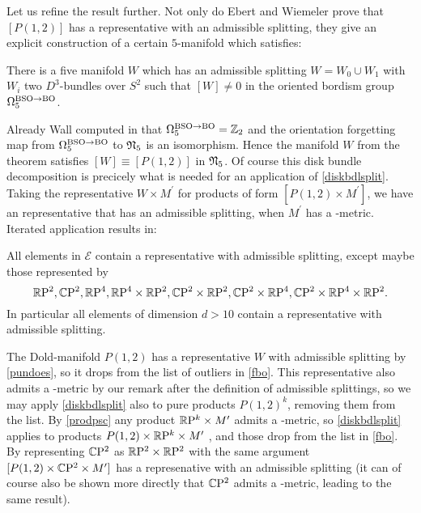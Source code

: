 Let us refine the result further.
Not only do Ebert and Wiemeler prove that $[P(1,2)]$ has a representative with an admissible splitting, they give an explicit construction of a certain $5$-manifold which satisfies:
\begin{thesislemma}\label{pundoes}
    There is a five manifold $W$ which has an admissible splitting $W=W_0 \cup W_1$ with $W_i$ two $D^3$-bundles over $S^2$ such that $[W]\neq 0$ in the oriented bordism group $\Omega_5^{\mathrm{BSO}\to\mathrm{BO}}$.
\end{thesislemma}
Already Wall computed in \cite{wall:bord} that $\Omega_5^{\mathrm{BSO}\to\mathrm{BO}}  = \mathbb{Z}_2$ and the orientation forgetting map from $\Omega_5^{\mathrm{BSO}\to\mathrm{BO}}$ to $\mathfrak{N}_5$ is an isomorphism.
Hence the manifold $W$ from the theorem satisfies $[W] \equiv [P(1,2)]$ in $\mathfrak{N}_5$.
Of course this disk bundle decomposition is precicely what is needed for an application of \ref{diskbdlsplit}.
Taking the representative $W\times M^\prime$ for products of form $[P(1,2)\times M^\prime]$, we have an representative that has an admissible splitting, when $M^\prime$ has a \psc-metric.
Iterated application results in:
\begin{thesisprop}
    All elements in $\mathcal{E}$ contain a representative with admissible splitting, except maybe those represented by 
    \begin{equation*}
        \mathbb{R}\mathrm{P}^2, \mathbb{C}\mathrm{P}^2, \mathbb{R}\mathrm{P}^4, \mathbb{R}\mathrm{P}^4\times\mathbb{R}\mathrm{P}^2, \mathbb{C}\mathrm{P}^2\times\mathbb{R}\mathrm{P}^2, \mathbb{C}\mathrm{P}^2\times\mathbb{R}\mathrm{P}^4, \mathbb{C}\mathrm{P}^2\times\mathbb{R}\mathrm{P}^4\times\mathbb{R}\mathrm{P}^2.
    \end{equation*}
    In particular all elements of dimension $d>10$ contain a representative with admissible splitting.
\end{thesisprop}
\prf
The Dold-manifold $P(1,2)$ has a representative $W$ with admissible splitting by \ref{pundoes}, so it drops from the list of outliers in \ref{fbo}.
This representative also admits a \psc-metric by our remark after the definition of admissible splittings,
so we may apply \ref{diskbdlsplit} also to pure products $P(1,2)^k$, removing them from the list.
By \ref{prodpsc} any product $\mathbb{R}\mathrm{P}^k\times M^\prime$ admits a \psc-metric, so \ref{diskbdlsplit} applies to products $P(1,2)\times\mathbb{R}\mathrm{P}^k\times M^\prime$ , and those drop from the list in \ref{fbo}.
By representing $\mathbb{C}\mathrm{P}^2$ as $\mathbb{R}\mathrm{P}^2\times\mathbb{R}\mathrm{P}^2$ with the same argument $[P(1,2)\times\mathbb{C}\mathrm{P}^2\times M^\prime]$ has a represenative with an admissible splitting (it can of course also be shown more directly that $\mathbb{C}\mathrm{P}^2$ admits a \psc-metric, leading to the same result).
